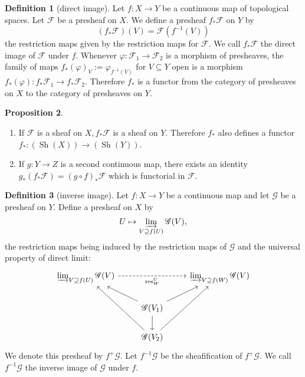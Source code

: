 \documentclass[12pt,a4paper]{book}
\newenvironment{enu}{\begin{enumerate}[(1)]}{\end{enumerate}}
\theoremstyle{definition}
\newtheorem{defn}{Definition}[section]
\newtheorem{prop}[defn]{Proposition}
\begin{document}
\begin{defn}[direct image]
    Let $f: X \rightarrow Y$ be a continuous map of topological spaces. Let $\mathscr{F}$ be a presheaf on $X$. We define a presheaf $f_* \mathscr{F}$ on $Y$ by
    $$
        \left(f_* \mathscr{F}\right)(V)=\mathscr{F}\left(f^{-1}(V)\right)
    $$
    the restriction maps given by the restriction maps for $\mathscr{F}$. We call $f_* \mathscr{F}$ the direct image of $\mathscr{F}$ under $f$. Whenever $\varphi: \mathscr{F}_1 \rightarrow \mathscr{F}_2$ is a morphism of presheaves, the family of maps $f_*(\varphi)_V:=\varphi_{f^{-1}(V)}$ for $V \subseteq Y$ open is a morphism $f_*(\varphi): f_* \mathscr{F}_1 \rightarrow f_* \mathscr{F}_2$. Therefore $f_*$ is a functor from the category of presheaves on $X$ to the category of presheaves on $Y$.
\end{defn}
\begin{prop}
    \begin{enu}
        \item If $\mathscr{F}$ is a sheaf on $X, f_* \mathscr{F}$ is a sheaf on $Y$. Therefore $f_*$ also defines a functor $f_*:(\operatorname{Sh}(X)) \rightarrow(\operatorname{Sh}(Y))$.
        \item If $g: Y \rightarrow Z$ is a second continuous map, there exists an identity $g_*\left(f_* \mathscr{F}\right)=(g \circ f)_* \mathscr{F}$ which is functorial in $\mathscr{F}$.
    \end{enu}
\end{prop}
\begin{defn}[inverse image]
    Let $f: X \rightarrow Y$ be a continuous map and let $\mathscr{G}$ be a presheaf on $Y$. Define a presheaf on $X$ by
    $$
        U \mapsto \varinjlim_{V \supseteq f(U)} \mathscr{G}(V),
    $$
    the restriction maps being induced by the restriction maps of $\mathscr{G}$ and the universal property of direct limit:
    \[\begin{tikzcd}
            {\varinjlim_{V \supseteq f(U)} \mathscr{G}(V)} && {\varinjlim_{V \supseteq f(W)} \mathscr{G}(V)} \\
            & {\mathscr{G}(V_1)} \\
            & {\mathscr{G}(V_2)}
            \arrow[from=2-2, to=1-1]
            \arrow[from=2-2, to=3-2]
            \arrow[from=3-2, to=1-1]
            \arrow[from=2-2, to=1-3]
            \arrow[from=3-2, to=1-3]
            \arrow["{\text{res}^{U}_{W}}"', dashed, from=1-1, to=1-3]
        \end{tikzcd}\]
    We denote this presheaf by $f^{+} \mathscr{G}$. Let $f^{-1} \mathscr{G}$ be the sheafification of $f^{+} \mathscr{G}$. We call $f^{-1} \mathscr{G}$ the inverse image of $\mathscr{G}$ under $f$.
\end{defn}
\end{document}
